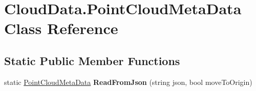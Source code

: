 \hypertarget{class_cloud_data_1_1_point_cloud_meta_data}{}\section{Cloud\+Data.\+Point\+Cloud\+Meta\+Data Class Reference}
\label{class_cloud_data_1_1_point_cloud_meta_data}
\subsection*{Static Public Member Functions}
\begin{DoxyCompactItemize}
\item 
\mbox{\label{class_cloud_data_1_1_point_cloud_meta_data_a3b43afa4f8f1dd2dc70582d011e05327}} 
static \hyperlink{class_cloud_data_1_1_point_cloud_meta_data}{Point\+Cloud\+Meta\+Data} {\bfseries Read\+From\+Json} (string json, bool move\+To\+Origin)
\end{DoxyCompactItemize}
